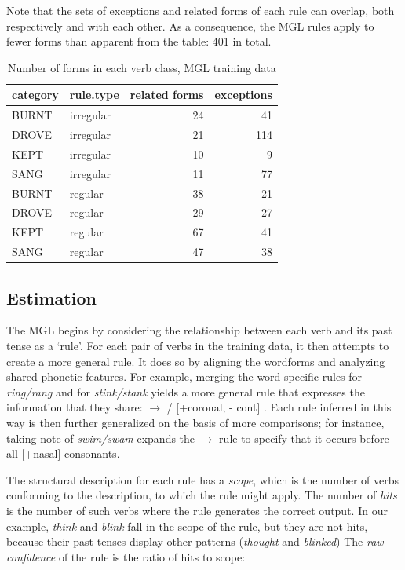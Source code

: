\documentclass[12pt]{article}
\begin{document}
Note that the sets of exceptions and related forms of each rule can overlap, both respectively and with each other. As a consequence, the MGL rules apply to fewer forms than apparent from the table: 401 in total.

\begin{table}[ht]
\centering
\begin{tabular}{llrr}
  \hline
category & rule.type & related forms & exceptions \\ 
  \hline
BURNT & irregular &  24 &  41 \\ 
  DROVE & irregular &  21 & 114 \\ 
  KEPT & irregular &  10 &   9 \\ 
  SANG & irregular &  11 &  77 \\ 
  BURNT & regular &  38 &  21 \\ 
  DROVE & regular &  29 &  27 \\ 
  KEPT & regular &  67 &  41 \\ 
  SANG & regular &  47 &  38 \\ 
   \hline
\end{tabular}
\caption{Number of forms in each verb class, MGL training data} 
\label{mglsetsize}
\end{table}
\subsection{Estimation}

The MGL begins by considering the relationship between each verb and its past tense as a `rule'. For each pair of verbs in the training data, it then attempts to create a more general rule. It does so by aligning the wordforms and analyzing shared phonetic features. For example,  merging the word-specific rules for {\em ring/rang} and for {\em stink/stank} yields a more general rule that expresses the information that they share: \textipa{[I]} $\rightarrow{}$\textipa{[\ae]} / [+coronal, - cont] \underline{\hspace{0.5cm}} \textipa{[N]}. Each rule inferred in this way is then further generalized on the basis of more comparisons; for instance, taking note of {\em swim/swam} expands the \textipa{[I]} $\rightarrow{}$\textipa{[\ae]} rule to specify that it occurs before all [+nasal] consonants. 

The structural description for each rule has a {\em scope}, which is the number of verbs conforming to the description, to which the rule might apply. The number of {\em hits} is the number of such verbs where the rule generates the correct output. In our example, {\em think} and {\em blink} fall in the scope of the rule, but they are not hits, because their past tenses display other patterns ({\em thought} and {\em blinked})
The {\it raw confidence} of the rule is the ratio of hits to scope: 
\end{document}
